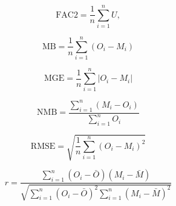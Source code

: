 \documentclass{article}
\begin{document}
\begin{equation}
\text{FAC2} = \frac{1}{n} \sum_{i=1}^{n} U,
\end{equation}

\begin{equation}
\text{MB} = \frac{1}{n} \sum_{i=1}^{n} (O_i - M_i)
\end{equation}

\begin{equation}
\text{MGE} = \frac{1}{n} \sum_{i=1}^{n} |O_i - M_i|
\end{equation}

\begin{equation}
\text{NMB} = \frac{\sum_{i=1}^{n} (M_i - O_i)}{\sum_{i=1}^{n} O_i}
\end{equation}

\begin{equation}
\text{RMSE} = \sqrt{\frac{1}{n} \sum_{i=1}^{n} (O_i - M_i)^2}
\end{equation}

\begin{equation}
r = \frac{\sum_{i=1}^{n} (O_i - \bar{O})(M_i - \bar{M})}{\sqrt{\sum_{i=1}^{n} (O_i - \bar{O})^2 \sum_{i=1}^{n} (M_i - \bar{M})^2}}
\end{equation}
\vspace{0.5cm}











\end{document}
